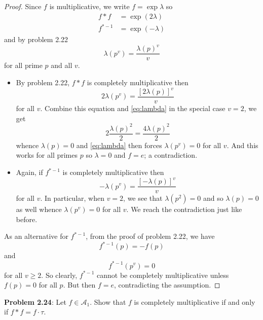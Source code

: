 \documentclass{article}
\newcommand{\A}{\mathcal{A}}
\begin{document}
\begin{proof}
Since $f$ is multiplicative, we write $f = \exp \lambda$ so
\begin{align*}
f * f &= \exp (2 \lambda)\\
f^{*-1} &= \exp (-\lambda)
\end{align*}
and by problem 2.22
\begin{equation}
\lambda(p^v) = \frac{\lambda(p)^v}{v}
\label{eq:lambda}
\end{equation}
for all prime $p$ and all $v$.

\begin{itemize}
\item By problem 2.22, $f * f$ is completely multiplicative then
$$2\lambda(p^v) = \frac{[2\lambda(p)]^v}{v}$$
for all $v$. Combine this equation and \eqref{eq:lambda} in the special case $v = 2$, we get
$$2\frac{\lambda(p)^2}{2} = \frac{4\lambda(p)^2}{2}$$
whence $\lambda(p) = 0$ and \eqref{eq:lambda} then forces $\lambda(p^v) = 0$ for all $v$. And this works for all primes $p$ so $\lambda = 0$ and $f = e$; a contradiction.

\item Again, if $f^{*-1}$ is completely multiplicative then
$$-\lambda(p^v) = \frac{[-\lambda(p)]^v}{v}$$
for all $v$.
In particular, when $v = 2$, we see that $\lambda(p^2) = 0$ and so $\lambda(p) = 0$ as well whence $\lambda(p^v) = 0$ for all $v$. We reach the contradiction just like before.
\end{itemize}

As an alternative for $f^{*-1}$, from the proof of problem 2.22, we have
$$f^{*-1}(p) = -f(p)$$
and
$$f^{*-1}(p^v) = 0$$
for all $v \geq 2$. So clearly, $f^{*-1}$ cannot be completely multiplicative unless $f(p) = 0$ for all $p$. But then $f = e$, contradicting the assumption.
\end{proof}

\textbf{Problem 2.24}: Let $f \in \A_1$. Show that $f$ is completely multiplicative if and only if $f * f = f \cdot \tau$.
\end{document}
